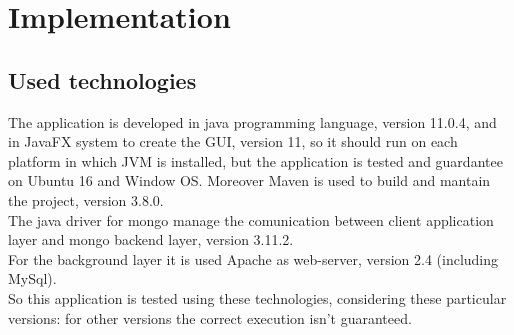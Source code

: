 \documentclass[a4paper, oneside]{article}
\begin{document}
\clearpage
\section{Implementation}
\subsection{Used technologies}
The application is developed in java programming language, version 11.0.4, and in JavaFX system to create the GUI, version 11, so it should run on each platform in which JVM is installed, but the application is tested and guardantee on Ubuntu 16 and Window OS. Moreover Maven is used  to build and mantain the project, version 3.8.0. \\
The java driver for mongo manage the comunication between client application layer and mongo backend layer, version 3.11.2.\\ 
For the background layer it is used Apache as web-server, version 2.4 (including MySql).\\
So this application is tested using these technologies, considering these particular versions: for other versions the correct execution isn't guaranteed.\\
\end{document}
